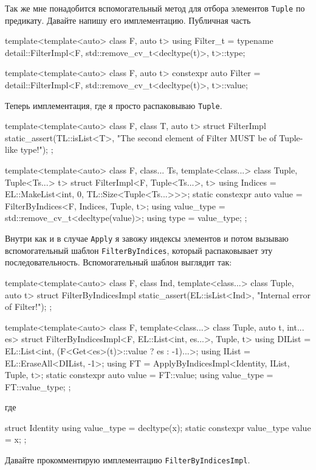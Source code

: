Так же мне понадобится вспомогательный метод для отбора элементов \verb"Tuple" по предикату.
Давайте напишу его имплементацию.
Публичная часть
\begin{cppcode}
template<template<auto> class F, auto t>
using Filter_t = typename detail::FilterImpl<F, std::remove_cv_t<decltype(t)>, t>::type;

template<template<auto> class F, auto t>
constexpr auto Filter = detail::FilterImpl<F, std::remove_cv_t<decltype(t)>, t>::value;
\end{cppcode}
Теперь имплементация, где я просто распаковываю \verb"Tuple".
\begin{cppcode}
template<template<auto> class F, class T, auto t>
struct FilterImpl {
  static_assert(TL::isList<T>, "The second element of Filter MUST be of Tuple-like type!");
};

template<template<auto> class F, class... Ts, template<class...> class Tuple, Tuple<Ts...> t>
struct FilterImpl<F, Tuple<Ts...>, t> {
  using Indices = EL::MakeList<int, 0, TL::Size<Tuple<Ts...>>>;
  static constexpr auto value = FilterByIndices<F, Indices, Tuple, t>;
  using value_type = std::remove_cv_t<decltype(value)>;
  using type = value_type;
};
\end{cppcode}
Внутри как и в случае \verb"Apply" я завожу индексы элементов и потом вызываю вспомогательный шаблон \verb"FilterByIndices", который распаковывает эту последовательность.
Вспомогательный шаблон выглядит так:
\begin{cppcode}
template<template<auto> class F, class Ind, template<class...> class Tuple, auto t>
struct FilterByIndicesImpl {
  static_assert(EL::isList<Ind>, "Internal error of Filter!");
};

template<template<auto> class F, template<class...> class Tuple, auto t, int... es>
struct FilterByIndicesImpl<F, EL::List<int, es...>, Tuple, t> {
  using DIList = EL::List<int, (F<Get<es>(t)>::value ? es : -1)...>;
  using IList = EL::EraseAll<DIList, -1>;
  using FT = ApplyByIndicesImpl<Identity, IList, Tuple, t>;
  static constexpr auto value = FT::value;
  using value_type = FT::value_type;
};
\end{cppcode}
где
\begin{cppcode}
struct Identity {
  using value_type = decltype(x);
  static constexpr value_type value = x;
};
\end{cppcode}
Давайте прокомментирую имплементацию \verb"FilterByIndicesImpl".
